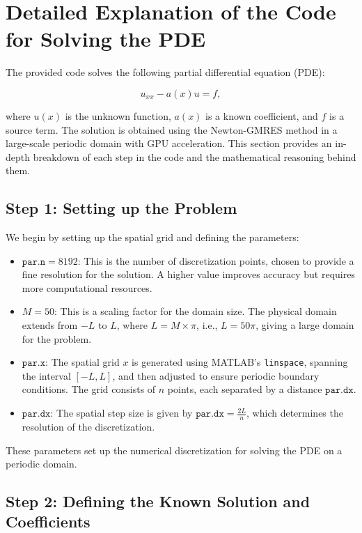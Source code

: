 \documentclass{article}
\begin{document}
\section*{Detailed Explanation of the Code for Solving the PDE}

The provided code solves the following partial differential equation (PDE):

\[
u_{xx} - a(x) u = f,
\]

where \( u(x) \) is the unknown function, \( a(x) \) is a known coefficient, and \( f \) is a source term. The solution is obtained using the Newton-GMRES method in a large-scale periodic domain with GPU acceleration. This section provides an in-depth breakdown of each step in the code and the mathematical reasoning behind them.

\subsection*{Step 1: Setting up the Problem}

We begin by setting up the spatial grid and defining the parameters:

\begin{itemize}
    \item \( \texttt{par.n} = 8192 \): This is the number of discretization points, chosen to provide a fine resolution for the solution. A higher value improves accuracy but requires more computational resources.
    \item \( M = 50 \): This is a scaling factor for the domain size. The physical domain extends from \( -L \) to \( L \), where \( L = M \times \pi \), i.e., \( L = 50\pi \), giving a large domain for the problem.
    \item \( \texttt{par.x} \): The spatial grid \( x \) is generated using MATLAB's \texttt{linspace}, spanning the interval \( [-L, L] \), and then adjusted to ensure periodic boundary conditions. The grid consists of \( n \) points, each separated by a distance \( \texttt{par.dx} \).
    \item \( \texttt{par.dx} \): The spatial step size is given by \( \texttt{par.dx} = \frac{2L}{n} \), which determines the resolution of the discretization.
\end{itemize}

These parameters set up the numerical discretization for solving the PDE on a periodic domain.

\subsection*{Step 2: Defining the Known Solution and Coefficients}
\end{document}
